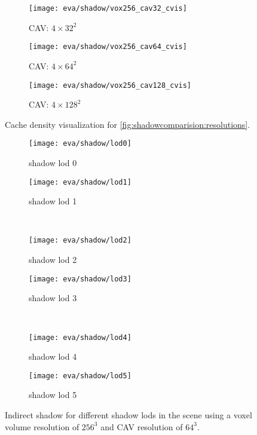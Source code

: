 \documentclass[thesis.tex]{subfiles}
\begin{document}
%
\begin{figure}
\centering
\begin{subfigure}[b]{0.27\textwidth}
\texttt{[image: eva/shadow/vox256\_cav32\_cvis]}
\caption{CAV: $4\times32^2$}
\end{subfigure}
\begin{subfigure}[b]{0.27\textwidth}
\texttt{[image: eva/shadow/vox256\_cav64\_cvis]}
\caption{CAV: $4\times64^2$}
\end{subfigure}
\begin{subfigure}[b]{0.27\textwidth}
\texttt{[image: eva/shadow/vox256\_cav128\_cvis]}
\caption{CAV: $4\times128^2$}
\end{subfigure}
\caption{Cache density visualization for \autoref{fig:shadowcomparision:resolutions}.}
\label{fig:shadowcomparision:resolutions:cavdensities}
\end{figure}
%
\begin{figure}
\begin{subfigure}[b]{\halfpageimage}
\texttt{[image: eva/shadow/lod0]}
\caption{shadow lod 0}
\end{subfigure}
\begin{subfigure}[b]{\halfpageimage}
\texttt{[image: eva/shadow/lod1]}
\caption{shadow lod 1}
\end{subfigure}
\\
\begin{subfigure}[b]{\halfpageimage}
\texttt{[image: eva/shadow/lod2]}
\caption{shadow lod 2}
\end{subfigure}
\begin{subfigure}[b]{\halfpageimage}
\texttt{[image: eva/shadow/lod3]}
\caption{shadow lod 3}
\end{subfigure}
\\
\begin{subfigure}[b]{\halfpageimage}
\texttt{[image: eva/shadow/lod4]}
\caption{shadow lod 4}
\end{subfigure}
\begin{subfigure}[b]{\halfpageimage}
\texttt{[image: eva/shadow/lod5]}
\caption{shadow lod 5}
\end{subfigure}
\caption{Indirect shadow for different shadow lods in the  scene using a voxel volume resolution of $256^3$ and CAV resolution of $64^3$. }
\label{fig:shadowcomparision:lod}
\end{figure}
%
\end{document}
